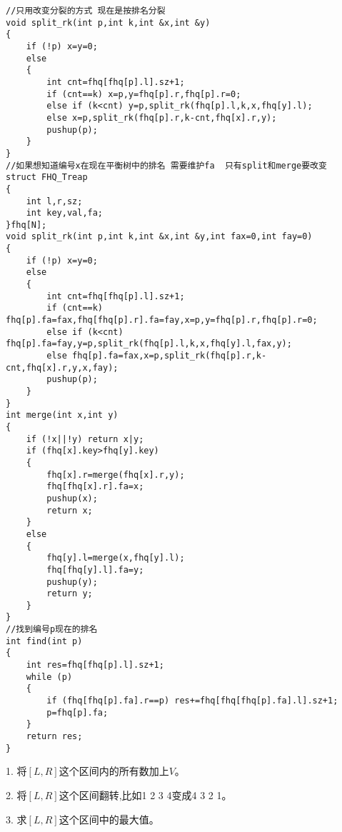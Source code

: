 \documentclass[a4paper]{ctexart}
\begin{document}
\begin{lstlisting}
//只用改变分裂的方式 现在是按排名分裂
void split_rk(int p,int k,int &x,int &y)
{
    if (!p) x=y=0;
    else
    {
        int cnt=fhq[fhq[p].l].sz+1;
        if (cnt==k) x=p,y=fhq[p].r,fhq[p].r=0;
        else if (k<cnt) y=p,split_rk(fhq[p].l,k,x,fhq[y].l);
        else x=p,split_rk(fhq[p].r,k-cnt,fhq[x].r,y);
        pushup(p);
    }
}
//如果想知道编号x在现在平衡树中的排名 需要维护fa  只有split和merge要改变
struct FHQ_Treap
{
    int l,r,sz;
    int key,val,fa;
}fhq[N];
void split_rk(int p,int k,int &x,int &y,int fax=0,int fay=0)
{
    if (!p) x=y=0;
    else
    {
        int cnt=fhq[fhq[p].l].sz+1;
        if (cnt==k) fhq[p].fa=fax,fhq[fhq[p].r].fa=fay,x=p,y=fhq[p].r,fhq[p].r=0;
        else if (k<cnt) fhq[p].fa=fay,y=p,split_rk(fhq[p].l,k,x,fhq[y].l,fax,y);
        else fhq[p].fa=fax,x=p,split_rk(fhq[p].r,k-cnt,fhq[x].r,y,x,fay);
        pushup(p);
    }
}
int merge(int x,int y)
{
    if (!x||!y) return x|y;
    if (fhq[x].key>fhq[y].key)
    {
        fhq[x].r=merge(fhq[x].r,y);
        fhq[fhq[x].r].fa=x;
        pushup(x);
        return x;
    }
    else
    {
        fhq[y].l=merge(x,fhq[y].l);
        fhq[fhq[y].l].fa=y;
        pushup(y);
        return y;
    }
}
//找到编号p现在的排名
int find(int p)
{
    int res=fhq[fhq[p].l].sz+1;
    while (p)
    {
        if (fhq[fhq[p].fa].r==p) res+=fhq[fhq[fhq[p].fa].l].sz+1;
        p=fhq[p].fa;
    }
    return res;
}
\end{lstlisting}

1. 将$[L,R]$这个区间内的所有数加上$V$。

2. 将$[L,R]$这个区间翻转,比如1 2 3 4变成4 3 2 1。

3. 求$[L,R]$这个区间中的最大值。
\end{document}
